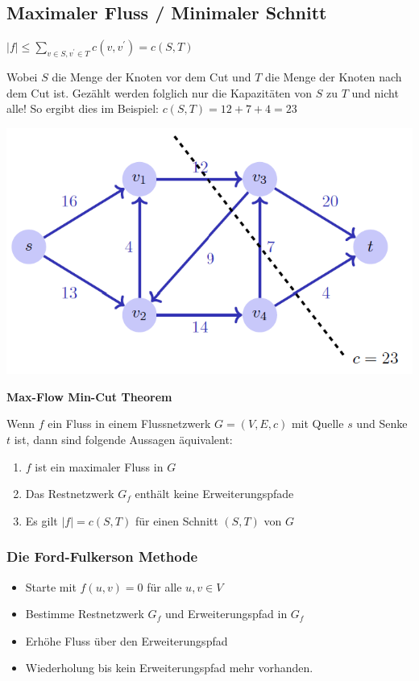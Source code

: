 \begin{sectionbox}
\subsection{Maximaler Fluss / Minimaler Schnitt}\smallskip
\begin{emphbox}
$|f| \leq \sum\limits_{v \in S, v^{\prime} \in T} c\left(v, v^{\prime}\right)=c(S, T)$
\end{emphbox}
Wobei $S$ die Menge der Knoten vor dem Cut und $T$ die Menge der Knoten nach dem Cut ist. Gezählt werden folglich nur die Kapazitäten von $S$ zu $T$ und nicht alle! So ergibt dies im Beispiel: $c(S,T)=12+7+4=23$\par\smallskip

\begin{center}
    \includegraphics[width = 0.9\columnwidth]{../img/maxFlow.png}
\end{center}\par\smallskip

\begin{greenbox}
\textbf{Max-Flow Min-Cut Theorem}\par
Wenn $f$ ein Fluss in einem Flussnetzwerk $G=(V, E, c)$ mit Quelle $s$ und Senke $t$ ist, dann sind folgende Aussagen äquivalent:
\begin{enumerate}
    \item $f$ ist ein maximaler Fluss in $G$
    \item Das Restnetzwerk $G_{f}$ enthält keine Erweiterungspfade
    \item Es gilt $|f|=c(S, T)$ für einen Schnitt $(S, T)$ von $G$
\end{enumerate}
\end{greenbox}\vspace{10px}

\subsubsection{Die Ford-Fulkerson Methode}\smallskip
\begin{itemize}
    \item Starte mit $f(u, v)=0$ für alle $u, v \in V$
    \item Bestimme Restnetzwerk $G_{f}$ und Erweiterungspfad in $G_{f}$
    \item Erhöhe Fluss über den Erweiterungspfad
    \item Wiederholung bis kein Erweiterungspfad mehr vorhanden.
\end{itemize}\smallskip


\end{sectionbox}
